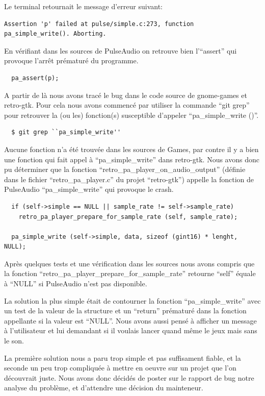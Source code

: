 \documentclass[12pt]{report}
\begin{document}
Le terminal retournait le message d'erreur suivant:
\begin{verbatim}
Assertion 'p' failed at pulse/simple.c:273, function pa_simple_write(). Aborting.
\end{verbatim}

En vérifiant dans les sources de PulseAudio on retrouve bien l'``assert'' qui provoque
l’arrêt prématuré du programme.
\begin{verbatim}
  pa_assert(p);
\end{verbatim}

A partir de là nous avons tracé le bug dans le code source de gnome-games et retro-gtk.
Pour cela nous avons commencé par utiliser la commande ``git grep'' pour retrouver
la (ou les) fonction(s) susceptible d'appeler ``pa\_simple\_write ()''.
\begin{verbatim}
  $ git grep ``pa_simple_write''
\end{verbatim}

Aucune fonction n'a été trouvée dans les sources de Games, par contre il y a bien
une fonction qui fait appel à ``pa\_simple\_write'' dans retro-gtk.
Nous avons donc pu déterminer que la fonction
``retro\_pa\_player\_on\_audio\_output'' (définie dans le fichier
``retro\_pa\_player.c'' du projet ``retro-gtk'') appelle la fonction de PulseAudio
``pa\_simple\_write'' qui provoque le crash.

\begin{verbatim}
  if (self->simple == NULL || sample_rate != self->sample_rate)
    retro_pa_player_prepare_for_sample_rate (self, sample_rate);

  pa_simple_write (self->simple, data, sizeof (gint16) * lenght, NULL);
\end{verbatim}
  
Après quelques tests et une vérification dans les sources nous  avons compris
que la fonction ``retro\_pa\_player\_prepare\_for\_sample\_rate'' retourne ``self''
équale à ``NULL'' si PulseAudio n'est pas disponible.

La solution la plus simple était de contourner la fonction ``pa\_simple\_write''
avec un test de la valeur de la structure et un ``return'' prématuré dans la fonction
appellante si la valeur est ``NULL''. Nous avons aussi pensé à afficher un message à
l'utilisateur et lui demandant si il voulais lancer quand même le jeux mais sans le son.

La première solution nous a paru trop simple et pas suffisament fiable, et la
seconde un peu trop compliquée à mettre en oeuvre sur un projet que l'on découvrait juste.
Nous avons donc décidés de poster sur le rapport de bug notre analyse du problème, et
d'attendre une décision du mainteneur.
\end{document}
